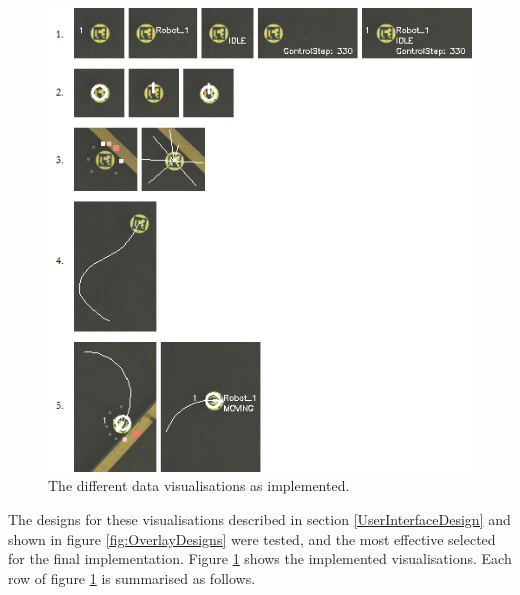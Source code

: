 \begin{figure}
	\centering
	\includegraphics[scale=1]{Figures/Overlays.png}
	\decoRule
	\caption[Data Visualisations]{The different data visualisations as implemented.}
	\label{fig:Overlays}
\end{figure}

The designs for these visualisations described in section \ref{UserInterfaceDesign} and shown in figure \ref{fig:OverlayDesigns} were tested, and the most effective selected for the final implementation. Figure \ref{fig:Overlays} shows the implemented visualisations. Each row of figure \ref{fig:Overlays} is summarised as follows.

